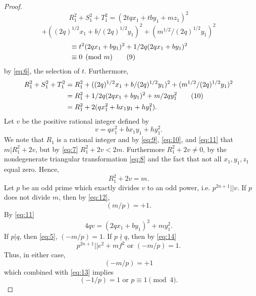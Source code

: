 \begin{proof}
$$R_{1}^{2}+S_{1}^{2}+T_{1}^{2}=(2tqx_{1}+tby_{1}+mz_{1})^{2}$$
$$+((2q)^{1/2}x_{1}+b/(2q)^{1/2}y_{1})^{2}+(m^{1/2}/(2q)^{1/2}y_{1})^{2}$$
\begin{align}
&\equiv t^{2}(2qx_{1}+by_{1})^{2}+1/2q(2qx_{1}+by_{1})^{2} \notag \\
&\equiv0 \pmod{m} \label{eq:9} \tag{9}
\end{align}
by \eqref{eq:6}, the selection of $t$.
Furthermore,
\begin{align}
R_{1}^{2}+S_{1}^{2}+T_{1}^{2}&=R_{1}^{2}+((2q)^{1/2}x_{1}+b/(2q)^{1/2}y_{1})^{2}+(m^{1/2}/(2q)^{1/2}y_{1})^{2} \notag \\
&=R_{1}^{2}+1/2q(2qx_{1}+by_{1})^{2}+m/2qy_{1}^{2} \label{eq:10} \tag{10} \\
&=R_{1}^{2}+2(qx_{1}^{2}+bx_{1}y_{1}+hy_{1}^{2}). \notag
\end{align}
Let $v$ be the positive rational integer defined by
\begin{equation}
v=qx_{1}^{2}+bx_{1}y_{1}+hy_{1}^2. \label{eq:11} \tag{11}
\end{equation}
We note that $R_{1}$ is a rational integer and by \eqref{eq:9}, \eqref{eq:10}, and \eqref{eq:11} that $m|R_{1}^{2}+2v$, but by \eqref{eq:7} $R_{1}^{2}+2v<2m$. Furthermore $R_{1}^{2}+2v\ne0$, by the nondegenerate triangular transformation \eqref{eq:8} and the fact that not all $x_{1}, y_{1}, z_{1}$ equal zero. Hence,
\begin{equation}
R_{1}^{2}+2v=m. \label{eq:12} \tag{12}
\end{equation}
Let $p$ be an odd prime which exactly divides $v$ to an odd power, i.e. $p^{2n+1}||v$.
If $p$ does not divide $m$, then by \eqref{eq:12},
\begin{equation}
(m/p)=+1. \label{eq:13} \tag{13}
\end{equation}
By \eqref{eq:11}
\begin{equation}
4qv=(2qx_{1}+by_{1})^{2}+my_{1}^2. \label{eq:14} \tag{14}
\end{equation}
If $p|q$, then \eqref{eq:5}, $(-m/p)=1$.
If $p \nmid q$, then by \eqref{eq:14}
$$p^{2n+1}||e^{2}+mf^{2} \text{ or } (-m/p)=1.$$
Thus, in either case,
\begin{equation}
(-m/p)=+1 \label{eq:15} \tag{15}
\end{equation}
which combined with \eqref{eq:13} implies
\begin{equation}
(-1/p)=1 \text{ or } p\equiv1 \pmod{4}. \label{eq:16} \tag{16}
\end{equation}


\end{proof}
